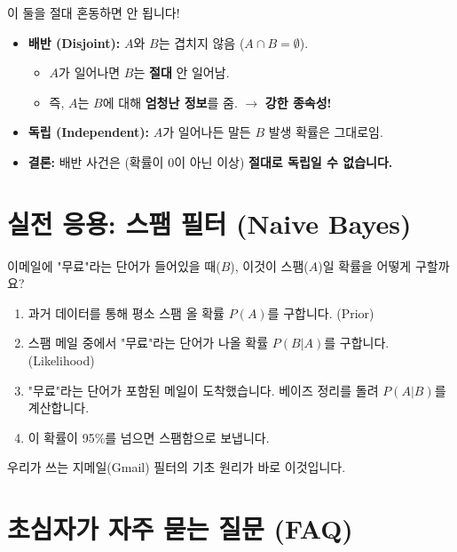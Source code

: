 \documentclass[11pt,a4paper]{book}
\theoremstyle{definition}
\begin{document}
\begin{warningbox}[title={독립(Independent) vs 배반(Disjoint)}]
이 둘을 절대 혼동하면 안 됩니다!
\begin{itemize}
    \item \textbf{배반 (Disjoint):} $A$와 $B$는 겹치지 않음 ($A \cap B = \emptyset$).
        \begin{itemize}
            \item $A$가 일어나면 $B$는 \textbf{절대} 안 일어남.
            \item 즉, $A$는 $B$에 대해 \textbf{엄청난 정보}를 줌. $\to$ \textbf{강한 종속성!}
        \end{itemize}
    \item \textbf{독립 (Independent):} $A$가 일어나든 말든 $B$ 발생 확률은 그대로임.
    \item \textbf{결론:} 배반 사건은 (확률이 0이 아닌 이상) \textbf{절대로 독립일 수 없습니다.}
\end{itemize}
\end{warningbox}

\section{실전 응용: 스팸 필터 (Naive Bayes)}

이메일에 "무료"라는 단어가 들어있을 때($B$), 이것이 스팸($A$)일 확률을 어떻게 구할까요?
\begin{enumerate}
    \item 과거 데이터를 통해 평소 스팸 올 확률 $P(A)$를 구합니다. (Prior)
    \item 스팸 메일 중에서 "무료"라는 단어가 나올 확률 $P(B|A)$를 구합니다. (Likelihood)
    \item "무료"라는 단어가 포함된 메일이 도착했습니다. 베이즈 정리를 돌려 $P(A|B)$를 계산합니다.
    \item 이 확률이 95\%를 넘으면 스팸함으로 보냅니다.
\end{enumerate}
우리가 쓰는 지메일(Gmail) 필터의 기초 원리가 바로 이것입니다.

\section{초심자가 자주 묻는 질문 (FAQ)}
\end{document}
